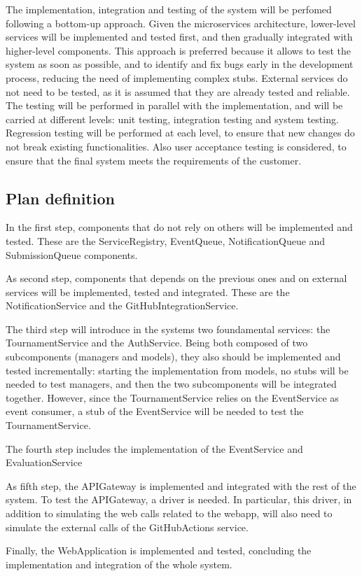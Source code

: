 The implementation, integration and testing of the system will be perfomed following a bottom-up approach.
Given the microservices architecture, lower-level services will be implemented and tested first, and then gradually integrated with higher-level components.
This approach is preferred because it allows to test the system as soon as possible, and to identify and fix bugs early in the development process, reducing the need of implementing complex stubs.
External services do not need to be tested, as it is assumed that they are already tested and reliable.
The testing will be performed in parallel with the implementation, and will be carried at different levels: unit testing, integration testing and system testing.
Regression testing will be performed at each level, to ensure that new changes do not break existing functionalities.
Also user acceptance testing is considered, to ensure that the final system meets the requirements of the customer.

\subsection{Plan definition}
In the first step, components that do not rely on others will be implemented and tested. These are the ServiceRegistry, EventQueue, NotificationQueue and SubmissionQueue components.

As second step, components that depends on the previous ones and on external services will be implemented, tested and integrated. These are the NotificationService and the GitHubIntegrationService.

The third step will introduce in the systems two foundamental services: the TournamentService and the AuthService. Being both composed of two subcomponents (managers and models), they also should be implemented and tested incrementally:
starting the implementation from models, no stubs will be needed to test managers, and then the two subcomponents will be integrated together.
However, since the TournamentService relies on the EventService as event consumer, a stub of the EventService will be needed to test the TournamentService.

The fourth step includes the implementation of the EventService and EvaluationService

As fifth step, the APIGateway is implemented and integrated with the rest of the system. To test the APIGateway, a driver is needed. In particular, this driver, in addition to simulating the web calls related to the webapp, will also need to simulate the external calls of the GitHubActions service.

Finally, the WebApplication is implemented and tested, concluding the implementation and integration of the whole system.